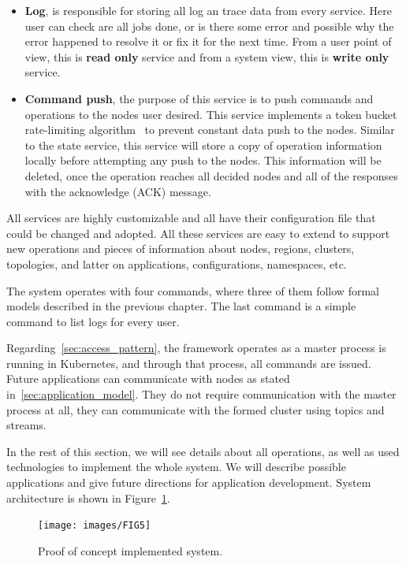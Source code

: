 \begin{itemize}
	\item \textbf{Log}, is responsible for storing all log an trace data from every service. Here user can check are all jobs done, or is there some error and possible why the error happened to resolve it or fix it for the next time. From a user point of view, this is \textbf{read only} service and from a system view, this is \textbf{write only} service.
	\item \textbf{Command push}, the purpose of this service is to push commands and operations to the nodes user desired. This service implements a token bucket rate-limiting algorithm~\cite{MathewsKG17} to prevent constant data push to the nodes. Similar to the state service, this service will store a copy of operation information locally before attempting any push to the nodes. This information will be deleted, once the operation reaches all decided nodes and all of the responses with the acknowledge (ACK) message.
\end{itemize}

\noindent
All services are highly customizable and all have their configuration file that could be changed and adopted. All these services are easy to extend to support new operations and pieces of information about nodes, regions, clusters, topologies, and latter on applications, configurations, namespaces, etc. 

The system operates with four commands, where three of them follow formal models described in the previous chapter. The last command is a simple command to list logs for every user.

Regarding~\ref{sec:access_pattern}, the framework operates as a master process is running in Kubernetes, and through that process, all commands are issued. Future applications can communicate with nodes as stated in~\ref{sec:application_model}. They do not require communication with the master process at all, they can communicate with the formed cluster using topics and streams.

In the rest of this section, we will see details about all operations, as well as used technologies to implement the whole system. We will describe possible applications and give future directions for application development. System architecture is shown in Figure~\ref{fig:fig11}.

\begin{figure}[H]
	\begin{center}
		\texttt{[image: images/FIG5]}
	\end{center}
	\vspace{-0.9cm}
	\caption{Proof of concept implemented system.}
	\label{fig:fig11}
\end{figure}
%
%
